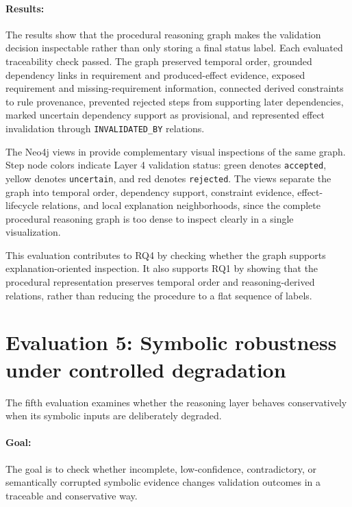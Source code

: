 \paragraph{Results:}
The results show that the procedural reasoning graph makes the validation
decision inspectable rather than only storing a final status label. Each evaluated
traceability check passed. The graph preserved temporal order, grounded
dependency links in requirement and produced-effect evidence, exposed requirement
and missing-requirement information, connected derived constraints to rule
provenance, prevented rejected steps from supporting later dependencies, marked
uncertain dependency support as provisional, and represented effect invalidation
through \texttt{INVALIDATED\_BY} relations.

The Neo4j views in
provide complementary visual inspections of the same graph. Step node colors
indicate Layer 4 validation status: green denotes \texttt{accepted}, yellow
denotes \texttt{uncertain}, and red denotes \texttt{rejected}. The views separate
the graph into temporal order, dependency support, constraint evidence,
effect-lifecycle relations, and local explanation neighborhoods, since the
complete procedural reasoning graph is too dense to inspect clearly in a single
visualization.

This evaluation contributes to RQ4 by checking whether the graph supports explanation-oriented inspection. It also supports RQ1 by showing that the procedural representation preserves temporal order and reasoning-derived relations, rather than reducing the procedure to a flat sequence of labels. 


\section{Evaluation 5: Symbolic robustness under controlled degradation}
\label{sec:evaluation-symbolic-degradation}

The fifth evaluation examines whether the reasoning layer behaves conservatively
when its symbolic inputs are deliberately degraded.

\paragraph{Goal:}
The goal is to check whether incomplete, low-confidence, contradictory, or
semantically corrupted symbolic evidence changes validation outcomes in a
traceable and conservative way. 

